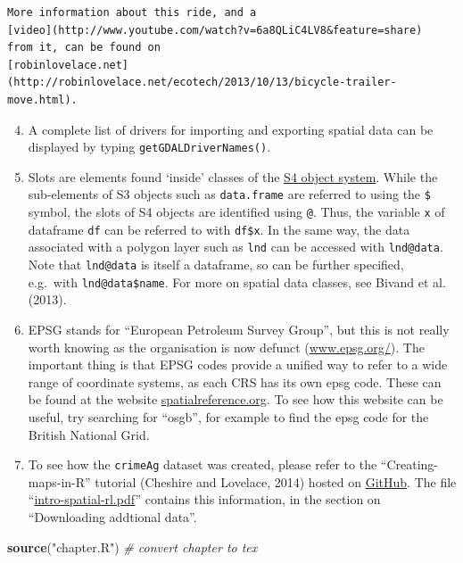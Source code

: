 \documentclass[]{article}
\newenvironment{Shaded}{}{}
\newcommand{\KeywordTok}[1]{\textcolor[rgb]{0.00,0.44,0.13}{\textbf{{#1}}}}
\newcommand{\StringTok}[1]{\textcolor[rgb]{0.25,0.44,0.63}{{#1}}}
\newcommand{\CommentTok}[1]{\textcolor[rgb]{0.38,0.63,0.69}{\textit{{#1}}}}
\newcommand{\NormalTok}[1]{{#1}}
\begin{document}
\begin{verbatim}
More information about this ride, and a
[video](http://www.youtube.com/watch?v=6a8QLiC4LV8&feature=share)
from it, can be found on
[robinlovelace.net](http://robinlovelace.net/ecotech/2013/10/13/bicycle-trailer-move.html).
\end{verbatim}
\begin{enumerate}[1.]
\setcounter{enumi}{3}
\item
  A complete list of drivers for importing and exporting spatial data
  can be displayed by typing \texttt{getGDALDriverNames()}.
\item
  Slots are elements found `inside' classes of the
  \href{http://adv-r.had.co.nz/S4.html}{S4 object system}. While the
  sub-elements of S3 objects such as \texttt{data.frame} are referred to
  using the \texttt{\$} symbol, the slots of S4 objects are identified
  using \texttt{@}. Thus, the variable \texttt{x} of dataframe
  \texttt{df} can be referred to with \texttt{df\$x}. In the same way,
  the data associated with a polygon layer such as \texttt{lnd} can be
  accessed with \texttt{lnd@data}. Note that \texttt{lnd@data} is itself
  a dataframe, so can be further specified, e.g.~with
  \texttt{lnd@data\$name}. For more on spatial data classes, see Bivand
  et al. (2013).
\item
  EPSG stands for ``European Petroleum Survey Group'', but this is not
  really worth knowing as the organisation is now defunct
  (\href{http://www.epsg.org/}{www.epsg.org/}). The important thing is
  that EPSG codes provide a unified way to refer to a wide range of
  coordinate systems, as each CRS has its own epsg code. These can be
  found at the website
  \href{http://spatialreference.org/}{spatialreference.org}. To see how
  this website can be useful, try searching for ``osgb'', for example to
  find the epsg code for the British National Grid.
\item
  To see how the \texttt{crimeAg} dataset was created, please refer to
  the ``Creating-maps-in-R'' tutorial (Cheshire and Lovelace, 2014)
  hosted on
  \href{https://github.com/Robinlovelace/Creating-maps-in-R}{GitHub}.
  The file
  ``\href{https://github.com/Robinlovelace/Creating-maps-in-R/blob/master/intro-spatial-rl.pdf}{intro-spatial-rl.pdf}''
  contains this information, in the section on ``Downloading addtional
  data''.
\end{enumerate}
\begin{Shaded}
\begin{Highlighting}[]
\KeywordTok{source}\NormalTok{(}\StringTok{"chapter.R"}\NormalTok{)  }\CommentTok{# convert chapter to tex}
\end{Highlighting}
\end{Shaded}
\end{document}
